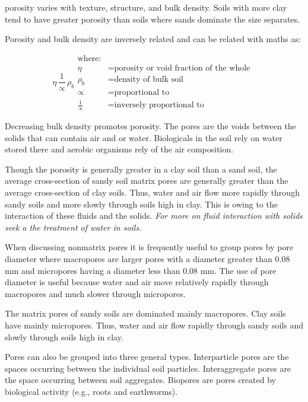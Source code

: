 \documentclass[a5paper]{report}
\begin{document}
porosity varies with texture, structure, and bulk density. Soils with more clay tend to have greater porosity than soils where sands dominate the size separates. 

Porosity and bulk density are inversely related and can be related with maths as:

\begin{equation}
    \eta \, \frac{1}{\propto} \, \rho_b
    \begin{aligned}
        \text{where:}\\
        \eta &= \text{porosity or void fraction of the whole }\\
        \rho_b &= \text{density of bulk soil}\\
        \propto &= \text{proportional to}\\
        \frac{1}{\propto} &= \text{inversely proportional to}
    \end{aligned}
\end{equation}

Decreasing bulk density promotes porosity. The pores are the voids between the solids that can contain air and or water. Biologicals in the soil rely on water stored there and aerobic organisms rely of the air composition.

Though the porosity is generally greater in a clay soil than a sand soil, the average cross-section of sandy soil matrix pores are generally greater than the average cross-section of clay soils. Thus, water and air flow more rapidly through sandy soils and more slowly through soils high in clay. This is owing to the interaction of these fluids and the solids. \textit{For more on fluid interaction with solids seek a the treatment of water in soils.}

When discussing nonmatrix pores it is frequently useful to group pores by pore diameter where macropores are larger pores with a diameter greater than 0.08 mm and micropores having a diameter less than 0.08 mm. The use of pore diameter is useful because water and air move relatively rapidly through macropores and much slower through micropores. 

The matrix pores of sandy soils are dominated mainly macropores. Clay soils have mainly micropores. Thus, water and air flow rapidly through sandy soils and slowly through soils high in clay.

Pores can also be grouped into three general types. Interparticle pores are the spaces occurring between the individual soil particles. Interaggregate pores are the space occurring between soil aggregates. Biopores are pores created by biological activity (e.g., roots and earthworms).
\end{document}
